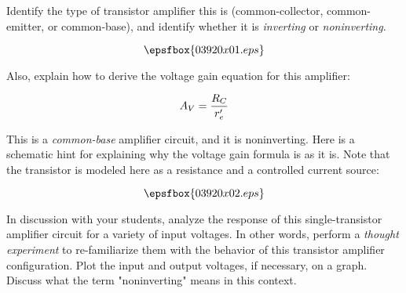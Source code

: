 

Identify the type of transistor amplifier this is (common-collector, common-emitter, or common-base), and identify whether it is {\it inverting} or {\it noninverting}.

$$\epsfbox{03920x01.eps}$$

Also, explain how to derive the voltage gain equation for this amplifier:

$$A_V = {R_C \over {r'_e}}$$







This is a {\it common-base} amplifier circuit, and it is noninverting.  Here is a schematic hint for explaining why the voltage gain formula is as it is.  Note that the transistor is modeled here as a resistance and a controlled current source:

$$\epsfbox{03920x02.eps}$$







In discussion with your students, analyze the response of this single-transistor amplifier circuit for a variety of input voltages.  In other words, perform a {\it thought experiment} to re-familiarize them with the behavior of this transistor amplifier configuration.  Plot the input and output voltages, if necessary, on a graph.  Discuss what the term "noninverting" means in this context.




